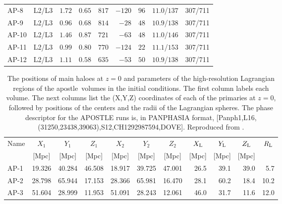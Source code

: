 \documentclass[10pt, a4paper]{article}
\newcommand{\apostle}{{\sc apostle}}
\begin{document}
\begin{table}
\begin {tabular}{lcrrrrrcc}
AP-8  &  L2/L3   & $1.72$  &  $0.65$  &  $817$   &   $-120$  & $96$  & $11.0$/$137$ &  307/711 \\
AP-9  &  L2/L3   & $0.96$ &  $0.68$  &  $814$   &   $-28$   & $48$  & $10.9$/$138$ &  307/711 \\
AP-10 &  L2/L3   & $1.46$  &   $0.87$ &  $721$   &   $-63$   & $48$  & $11.0$/$146$ &  307/711 \\
AP-11 &  L2/L3   & $0.99$ &   $0.80$ &  $770$   &   $-124$  & $22$  & $11.1$/$153$ &  307/711 \\
AP-12 &  L2/L3   & $1.11$  &  $0.58$  &  $635$   &   $-53$   & $50$  & $10.9$/$138$ &  307/711 \\
\hline
\end{tabular}
\label{TabLGSims}
\end{table}

\begin{table}
\caption{The positions of main haloes at $z=0$ and parameters of the high-resolution Lagrangian regions of the \apostle\ volumes in the initial conditions. The first column labels each volume. The next columns list the ({\small X,Y,Z}) coordinates of each of the primaries at $z=0$, followed by positions of the centers and the radii of the Lagrangian spheres. The phase descriptor for the {\small APOSTLE} runs is, in {\small PANPHASIA} format, {[Panph1,L16,(31250,23438,39063),S12,CH1292987594,DOVE]}. Reproduced from \cite{2016MNRAS.457..844F}.}
\vspace{5pt}
\centering
\begin {tabular}{lrrrrrrrrrr}
\hline
\multicolumn{1}{c}{Name} &
\multicolumn{1}{c}{$X_{1}$} &
\multicolumn{1}{c}{$Y_1$} &
\multicolumn{1}{c}{$Z_1$} &
\multicolumn{1}{c}{$X_2$} &
\multicolumn{1}{c}{$Y_2$} &
\multicolumn{1}{c}{$Z_2$} &
\multicolumn{1}{c}{$X_{\rm L}$} &
\multicolumn{1}{c}{$Y_{\rm L}$} &
\multicolumn{1}{c}{$Z_{\rm L}$} &
\multicolumn{1}{c}{$R_{\rm L}$} \\
&
\multicolumn{1}{c}{[Mpc]} &
\multicolumn{1}{c}{[Mpc]} &
\multicolumn{1}{c}{[Mpc]} &
\multicolumn{1}{c}{[Mpc]} &
\multicolumn{1}{c}{[Mpc]} &
\multicolumn{1}{c}{[Mpc]} &
\multicolumn{1}{c}{[Mpc]} &
\multicolumn{1}{c}{[Mpc]} &
\multicolumn{1}{c}{[Mpc]} \\
\hline
AP-1  & 19.326    & 40.284   &	46.508  &   18.917 &  39.725   &  47.001 &  26.5   &	39.1    &  39.0   & 5.7     \\
AP-2  & 28.798	  & 65.944   &	17.153  &   28.366 &  65.981   &  16.470 &  28.1   & 	60.2    & 18.4	  & 10.2    \\
AP-3  & 51.604    & 28.999   &	11.953  &   51.091 &  28.243   &  12.061 &  46.0   &	31.7    & 11.6    & 12.0     \\

\end{tabular}
\end{table}
\end{document}
